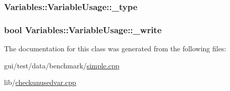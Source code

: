 \hypertarget{class_variables_1_1_variable_usage_a0a62412f6544ea9bc298eec96e04fe30}{
\subsubsection[{\-\_\-type}]{ Variables\-::\-Variable\-Usage\-::\-\_\-type}}\label{class_variables_1_1_variable_usage_a0a62412f6544ea9bc298eec96e04fe30}
\hypertarget{class_variables_1_1_variable_usage_a5e3ffabcd11826559744904877088aad}{
\subsubsection[{\-\_\-write}]{\setlength{\rightskip}{0pt plus 5cm}bool Variables\-::\-Variable\-Usage\-::\-\_\-write}}\label{class_variables_1_1_variable_usage_a5e3ffabcd11826559744904877088aad}


The documentation for this class was generated from the following files\-:\begin{DoxyCompactItemize}
\item 
gui/test/data/benchmark/\hyperlink{simple_8cpp}{simple.\-cpp}\item 
lib/\hyperlink{checkunusedvar_8cpp}{checkunusedvar.\-cpp}\end{DoxyCompactItemize}
